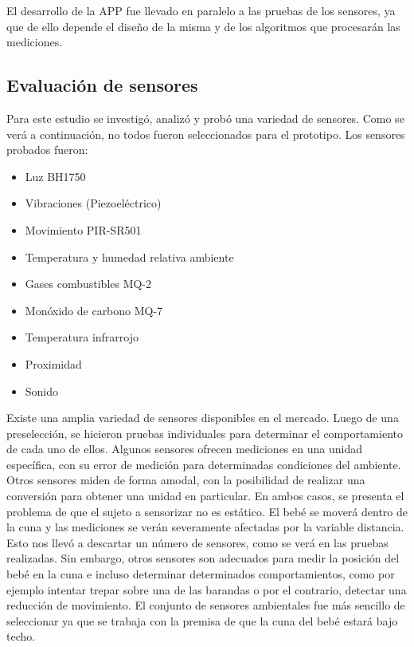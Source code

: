 \documentclass{IEEEtran}
\begin{document}
El desarrollo de la APP fue llevado en paralelo a las pruebas de los sensores, ya que de ello depende el diseño de la misma y de los algoritmos que procesarán las mediciones.

\subsection{Evaluación de sensores}

Para este estudio se investigó, analizó y probó una variedad de sensores. Como se verá a continuación, no todos fueron seleccionados para el prototipo. Los sensores probados fueron: 

			\begin{itemize}
				\item Luz BH1750
				\item Vibraciones (Piezoeléctrico)
				\item Movimiento PIR-SR501
				\item Temperatura y humedad relativa ambiente
				\item Gases combustibles MQ-2
				\item Monóxido de carbono MQ-7
				\item Temperatura infrarrojo
				\item Proximidad
				\item Sonido
			\end{itemize}

Existe una amplia variedad de sensores disponibles en el mercado. Luego de una preselección, se hicieron pruebas individuales para determinar el comportamiento de cada uno de ellos.
Algunos sensores ofrecen mediciones en una unidad específica, con su error de medición para determinadas condiciones del ambiente. Otros sensores miden de forma amodal, con la posibilidad de realizar una conversión para obtener una unidad en particular.
En ambos casos, se presenta el problema de que el sujeto a sensorizar no es estático. El bebé se moverá dentro de la cuna y las mediciones se verán severamente afectadas por la variable distancia. Esto nos llevó a descartar un número de sensores, como se verá en las pruebas realizadas. Sin embargo, otros sensores son adecuados para medir la posición del bebé en la cuna e incluso determinar determinados comportamientos, como por ejemplo intentar trepar sobre una de las barandas o por el contrario, detectar una reducción de movimiento.
El conjunto de sensores ambientales fue más sencillo de seleccionar ya que se trabaja con la premisa de que la cuna del bebé estará bajo techo. 
\end{document}
